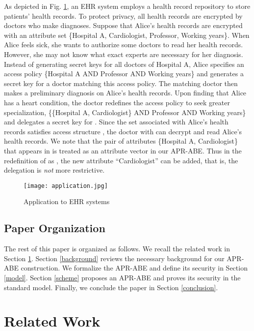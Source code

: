 \documentclass[twocolumn]{svjour3}          \smartqed  \usepackage{graphicx}
\begin{document}
As depicted in Fig. \ref{application}, an EHR system employs a health record repository to store patients' health records. To protect privacy, all health records are encrypted by doctors who make diagnoses. Suppose that Alice's health records are encrypted with an 
attribute set \{Hospital A, Cardiologist, Professor, Working years\}. When Alice feels sick, she wants to authorize some doctors to read her health records. However, she may not know what exact experts are necessary for her diagnosis. Instead of generating secret keys for all doctors of Hospital A, Alice specifies an access policy \{Hospital A AND Professor AND Working years\} and generates a secret key  for a doctor matching this access policy. The matching doctor then makes a preliminary diagnosis on Alice's health records. Upon finding that Alice has
a heart condition,  the doctor redefines the access policy 
to seek greater specialization, \{\{Hospital A, Cardiologist\} AND Professor AND Working years\} and delegates a secret key for . Since the set  associated with Alice's health records satisfies access structure , the doctor with  can decrypt and read Alice's health records. 
We note that the pair 
of attributes \{Hospital A, Cardiologist\} 
that appears in  is treated as an attribute vector in our APR-ABE.
Thus in the 
redefinition of  as , the new attribute ``Cardiologist'' can be added, that is, the delegation is {\em not} more restrictive.

\begin{figure}
\texttt{[image: application.jpg]}
\caption{Application to EHR systems}
\label{application}       \end{figure}


\subsection{Paper Organization}

The rest of this paper is organized as follows. We recall the related work in Section \ref{related}. Section \ref{background} reviews the necessary background for our APR-ABE construction. We formalize the APR-ABE and define its security in Section \ref{model}. Section \ref{scheme} proposes an APR-ABE and proves its security in the standard model. Finally, we conclude the paper in Section \ref{conclusion}.

\section{Related Work}
\label{related}
\end{document}
